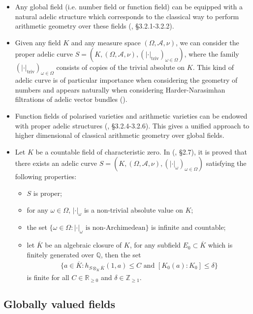 \documentclass [11pt,reqno]{amsart}
\def\bQ{{\mathbb{Q}}}
\def\bR{{\mathbb{R}}}
\def\bZ{{\mathbb{Z}}}
\newcommand{\1}{\mathmybb{1}}
\def\cA{{\mathcal{A}}}
\def\triv{\operatorname{triv}}
\newcommand{\va}{|\cdot|}
\begin{document}
\begin{itemize}
	\item Any global field (i.e. number field or function field) can be equipped with a natural adelic structure which corresponds to the classical way to perform arithmetic geometry over these fields (\cite{ChenMori}, \S 3.2.1-3.2.2).
	\item Given any field $K$ and any measure space $(\Omega,\cA,\nu)$, we can consider the proper adelic curve $S=(K,(\Omega,\cA,\nu),(|\cdot|_{\triv})_{\omega\in\Omega})$, where the family $(|\cdot|_{\triv})_{\omega\in\Omega}$ consists of copies of the trivial absolute on $K$. This kind of adelic curve is of particular importance when considering the geometry of numbers and appears naturally when considering Harder-Narasimhan filtrations of adelic vector bundles (\cite{ChenMori24}).
	\item Function fields of polarised varieties and arithmetic varieties can be endowed with proper adelic structures (\cite{ChenMori}, \S 3.2.4-3.2.6). This gives a unified approach to higher dimensional of classical arithmetic geometry over global fields. 
	\item Let $K$ be a countable field of characteristic zero. In (\cite{ChenMori21}, \S 2.7), it is proved that there exists an adelic curve $S=(K,(\Omega,\cA,\nu),(\va_{\omega})_{\omega\in \Omega})$ satisfying the following properties:
	\begin{itemize}
		\item[(1)] $S$ is proper;
		\item[(2)] for any $\omega\in\Omega$, $\va_\omega$ is a non-trivial absolute value on $K$;
		\item[(3)] the set $\{\omega\in\Omega : \va_{\omega} \text{ is non-Archimedean}\}$ is infinite and countable;
		\item[(4)] let $\overline{K}$ be an algebraic closure of $K$, for any subfield $E_0\subset \overline{K}$ which is finitely generated over $\bQ$, then the set
		\begin{align*}
		\{a\in \overline{K} : h_{S\otimes_{K} \overline{K}}(1,a) \leq C \text{ and } [K_{0}(a):K_0] \leq \delta\}
		\end{align*}
		is finite for all $C\in \bR_{\geq 0}$ and $\delta\in \bZ_{\geq 1}$.
	\end{itemize}
	
\end{itemize}

\subsection{Globally valued fields}
\label{sub:GVF}
\end{document}

